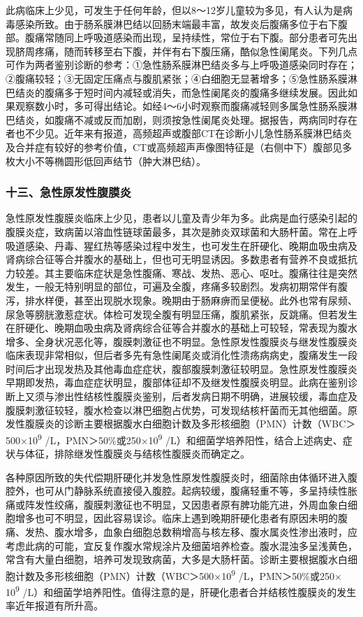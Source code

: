 此病临床上少见，可发生于任何年龄，但以8～12岁儿童较为多见，有人认为是病毒感染所致。由于肠系膜淋巴结以回肠末端最丰富，故发炎后腹痛多位于右下腹部。腹痛常随同上呼吸道感染而出现，呈持续性，常位于右下腹。部分患者可先出现脐周疼痛，随而转移至右下腹，并伴有右下腹压痛，酷似急性阑尾炎。下列几点可作为两者鉴别诊断的参考：①急性肠系膜淋巴结炎多与上呼吸道感染同时存在；②腹痛较轻；③无固定压痛点与腹肌紧张；④白细胞无显著增多；⑤急性肠系膜淋巴结炎的腹痛多于短时间内减轻或消失，而急性阑尾炎的腹痛多继续发展。因此如果观察数小时，多可得出结论。如经4～6小时观察而腹痛减轻则多属急性肠系膜淋巴结炎，如腹痛不减或反而加剧，则须按急性阑尾炎处理。据报告，两病同时存在者也不少见。近年来有报道，高频超声或腹部CT在诊断小儿急性肠系膜淋巴结炎及合并症有较好的参考价值，CT或高频超声声像图特征是（右侧中下）腹部见多枚大小不等椭圆形低回声结节（肿大淋巴结）。

\subsubsection{十三、急性原发性腹膜炎}

急性原发性腹膜炎临床上少见，患者以儿童及青少年为多。此病是血行感染引起的腹膜炎症，致病菌以溶血性链球菌最多，其次是肺炎双球菌和大肠杆菌。常在上呼吸道感染、丹毒、猩红热等感染过程中发生，也可发生在肝硬化、晚期血吸虫病及肾病综合征等合并腹水的基础上，但也可无明显诱因。多数患者有营养不良或抵抗力较差。其主要临床症状是急性腹痛、寒战、发热、恶心、呕吐。腹痛往往是突然发生，一般无特别明显的部位，可遍及全腹，疼痛多较剧烈。发病初期常伴有腹泻，排水样便，甚至出现脱水现象。晚期由于肠麻痹而呈便秘。此外也常有尿频、尿急等膀胱激惹症状。体检可发现全腹有明显压痛，腹肌紧张，反跳痛。但若发生在肝硬化、晚期血吸虫病及肾病综合征等合并腹水的基础上可较轻，常表现为腹水增多、全身状况恶化等，腹膜刺激征也不明显。急性原发性腹膜炎与继发性腹膜炎临床表现非常相似，但后者多先有急性阑尾炎或消化性溃疡病病史，腹痛发生一段时间后才出现发热及其他毒血症症状，腹部腹膜刺激征较明显。急性原发性腹膜炎早期即发热，毒血症症状明显，腹部体征却不及继发性腹膜炎明显。此病在鉴别诊断上又须与渗出性结核性腹膜炎鉴别，后者发病日期不明确，进展较缓，毒血症及腹膜刺激征较轻，腹水检查以淋巴细胞占优势，可发现结核杆菌而无其他细菌。原发性腹膜炎的诊断主要根据腹水白细胞计数及多形核细胞（PMN）计数（WBC＞500×10\textsuperscript{9}
/L，PMN＞50\%或250×10\textsuperscript{9}
/L）和细菌学培养阳性，结合上述病史、症状与体征，排除继发性腹膜炎与结核性腹膜炎而确定之。

各种原因所致的失代偿期肝硬化并发急性原发性腹膜炎时，细菌除由体循环进入腹腔外，也可从门静脉系统直接侵入腹腔。起病较缓，腹痛轻重不等，多呈持续性胀痛或阵发性绞痛，腹膜刺激征也不明显，又因患者原有脾功能亢进，外周血象白细胞增多也可不明显，因此容易误诊。临床上遇到晚期肝硬化患者有原因未明的腹痛、发热、腹水增多，血象白细胞总数稍增高与核左移、腹水属炎性渗出液时，应考虑此病的可能，宜反复作腹水常规涂片及细菌培养检查。腹水混浊多呈浅黄色，常含有大量白细胞，培养可发现致病菌，大多是大肠杆菌。诊断主要根据腹水白细胞计数及多形核细胞（PMN）计数（WBC＞500×10\textsuperscript{9}
/L，PMN＞50\%或250× 10\textsuperscript{9}
/L）和细菌学培养阳性。值得注意的是，肝硬化患者合并结核性腹膜炎的发生率近年报道有所升高。

